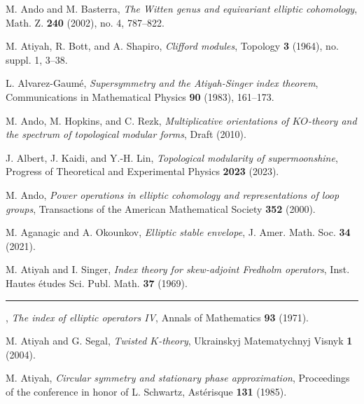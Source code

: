 \begin{description}[leftmargin=5.6em,labelwidth=5.2em,labelsep=0.4em,itemsep=0.5ex,parsep=0pt,topsep=0.8ex]

\item[\textbf{[AB02]}] M. Ando and M. Basterra, \textit{The Witten genus and equivariant elliptic cohomology}, Math. Z. \textbf{240} (2002), no. 4, 787--822.
\item[\textbf{[ABS64]}] M. Atiyah, R. Bott, and A. Shapiro, \textit{Clifford modules}, Topology \textbf{3} (1964), no. suppl. 1, 3--38.
\item[\textbf{[AG83]}] L. Alvarez-Gaum\'e, \textit{Supersymmetry and the Atiyah-Singer index theorem}, Communications in Mathematical Physics \textbf{90} (1983), 161--173.
\item[\textbf{[AHR10]}] M. Ando, M. Hopkins, and C. Rezk, \textit{Multiplicative orientations of $KO$-theory and the spectrum of topological modular forms}, Draft (2010).
\item[\textbf{[AKL23]}] J. Albert, J. Kaidi, and Y.-H. Lin, \textit{Topological modularity of supermoonshine}, Progress of Theoretical and Experimental Physics \textbf{2023} (2023).
\item[\textbf{[And00]}] M. Ando, \textit{Power operations in elliptic cohomology and representations of loop groups}, Transactions of the American Mathematical Society \textbf{352} (2000).
\item[\textbf{[AO21]}] M. Aganagic and A. Okounkov, \textit{Elliptic stable envelope}, J. Amer. Math. Soc. \textbf{34} (2021).
\item[\textbf{[AS69]}] M. Atiyah and I. Singer, \textit{Index theory for skew-adjoint Fredholm operators}, Inst. Hautes \'etudes Sci. Publ. Math. \textbf{37} (1969).
\item[\textbf{[AS71]}] \rule[0.45ex]{2.6em}{0.45pt}, \textit{The index of elliptic operators IV}, Annals of Mathematics \textbf{93} (1971).
\item[\textbf{[AS04]}] M. Atiyah and G. Segal, \textit{Twisted $K$-theory}, Ukrainskyj Matematychnyj Visnyk \textbf{1} (2004).
\item[\textbf{[Ati85]}] M. Atiyah, \textit{Circular symmetry and stationary phase approximation}, Proceedings of the conference in honor of L. Schwartz, Ast\'erisque \textbf{131} (1985).

\end{description}
